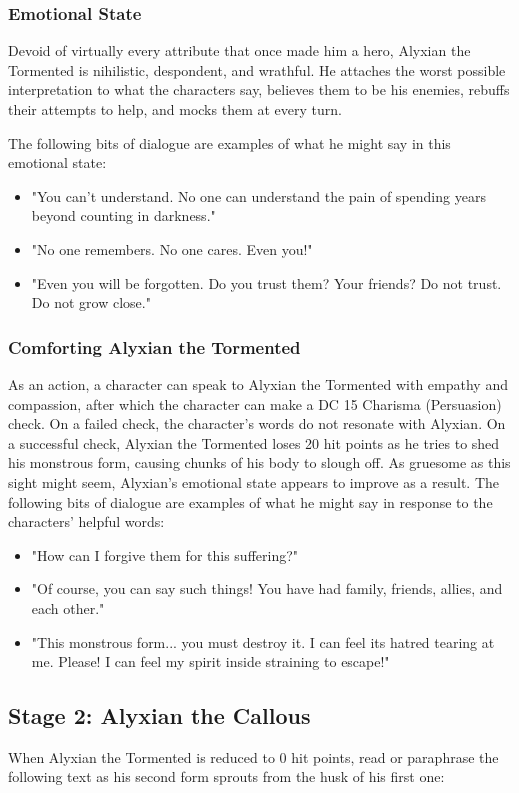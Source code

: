 \documentclass[10pt,a4paper,twoside,fancy,bg=print,twocolumn,openany,nodeprecatedcode]{dndbook}
\begin{document}
\subsubsection{Emotional State}
Devoid of virtually every attribute that once made him a hero, Alyxian the Tormented is nihilistic, despondent, and wrathful. He attaches the worst possible interpretation to what the characters say, believes them to be his enemies, rebuffs their attempts to help, and mocks them at every turn.

The following bits of dialogue are examples of what he might say in this emotional state:


\begin{itemize}
\item "You can't understand. No one can understand the pain of spending years beyond counting in darkness."
\item "No one remembers. No one cares. Even you!"
\item "Even you will be forgotten. Do you trust them? Your friends? Do not trust. Do not grow close."
\end{itemize}

\subsubsection{Comforting Alyxian the Tormented}
As an action, a character can speak to Alyxian the Tormented with empathy and compassion, after which the character can make a DC 15 Charisma (Persuasion) check. On a failed check, the character's words do not resonate with Alyxian. On a successful check, Alyxian the Tormented loses 20 hit points as he tries to shed his monstrous form, causing chunks of his body to slough off. As gruesome as this sight might seem, Alyxian's emotional state appears to improve as a result. The following bits of dialogue are examples of what he might say in response to the characters' helpful words:


\begin{itemize}
\item "How can I forgive them for this suffering?"
\item "Of course, you can say such things! You have had family, friends, allies, and each other."
\item "This monstrous form... you must destroy it. I can feel its hatred tearing at me. Please! I can feel my spirit inside straining to escape!"
\end{itemize}

\subsection{Stage 2: Alyxian the Callous}
When Alyxian the Tormented is reduced to 0 hit points, read or paraphrase the following text as his second form sprouts from the husk of his first one:
\end{document}
